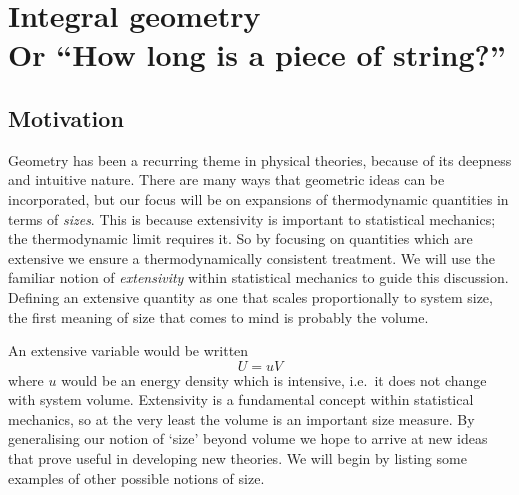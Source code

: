 \section[Integral geometry. Or ``How long is a piece of string?'']{Integral geometry\\ {\large Or ``How long is a piece of string?''}}
\label{sec:integral-geometry}

\subsection{Motivation}

Geometry has been a recurring theme in physical theories, because of its deepness and intuitive nature.
There are many ways that geometric ideas can be incorporated, but our focus will be on expansions of thermodynamic quantities in terms of \emph{sizes}.
This is because extensivity is important to statistical mechanics; the thermodynamic limit requires it.
So by focusing on quantities which are extensive we ensure a thermodynamically consistent treatment.
We will use the familiar notion of \emph{extensivity} within statistical mechanics to guide this discussion.
Defining an extensive quantity as one that scales proportionally to system size, the first meaning of size that comes to mind is probably the volume.

An extensive variable would be written
\begin{equation*}
  U = u V
\end{equation*}
where $u$ would be an energy density which is intensive, i.e.\ it does not change with system volume.
Extensivity is a fundamental concept within statistical mechanics, so at the very least the volume is an important size measure.
By generalising our notion of `size' beyond volume we hope to arrive at new ideas that prove useful in developing new theories.
We will begin by listing some examples of other possible notions of size.

